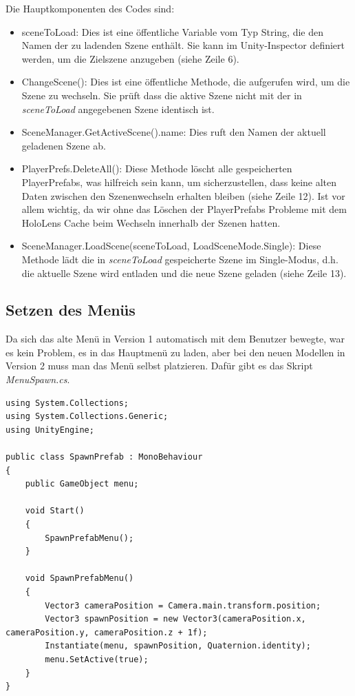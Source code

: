 Die Hauptkomponenten des Codes sind:
\begin{itemize}
    \item{sceneToLoad:} Dies ist eine öffentliche Variable vom Typ String, die den Namen der zu ladenden Szene enthält. Sie
    kann im Unity-Inspector definiert werden, um die Zielszene anzugeben (siehe Zeile 6).
    \item{ChangeScene():} Dies ist eine öffentliche Methode, die aufgerufen wird, um die Szene zu wechseln. Sie prüft dass
    die aktive Szene nicht mit der in \textit{sceneToLoad} angegebenen Szene identisch ist.
    \item{SceneManager.GetActiveScene().name:} Dies ruft den Namen der aktuell geladenen Szene ab.
    \item{PlayerPrefs.DeleteAll():} Diese Methode löscht alle gespeicherten PlayerPrefabs, was hilfreich sein kann, um
    sicherzustellen, dass keine alten Daten zwischen den Szenenwechseln erhalten bleiben (siehe Zeile 12). Ist vor allem wichtig,
    da wir ohne das Löschen der PlayerPrefabs Probleme mit dem HoloLens Cache beim Wechseln innerhalb der Szenen hatten.
    \item{SceneManager.LoadScene(sceneToLoad, LoadSceneMode.Single):} Diese Methode lädt die in \textit{sceneToLoad}
    gespeicherte Szene im Single-Modus, d.h. die aktuelle Szene wird entladen und die neue Szene geladen (siehe Zeile 13).
\end{itemize}

\subsection{Setzen des Menüs}
Da sich das alte Menü in Version 1 automatisch mit dem Benutzer bewegte, war es kein Problem, es in das Hauptmenü zu laden,
aber bei den neuen Modellen in Version 2 muss man das Menü selbst platzieren. Dafür gibt es das Skript \textit{MenuSpawn.cs}.

\begin{lstlisting}[style=csharp, caption=Auf Knopfdruck Szene wechseln. label=code:spawnmenu]
using System.Collections;
using System.Collections.Generic;
using UnityEngine;

public class SpawnPrefab : MonoBehaviour
{
    public GameObject menu;

    void Start()
    {
        SpawnPrefabMenu();
    }

    void SpawnPrefabMenu()
    {
        Vector3 cameraPosition = Camera.main.transform.position;
        Vector3 spawnPosition = new Vector3(cameraPosition.x, cameraPosition.y, cameraPosition.z + 1f);
        Instantiate(menu, spawnPosition, Quaternion.identity);
        menu.SetActive(true);
    }
}
\end{lstlisting}

